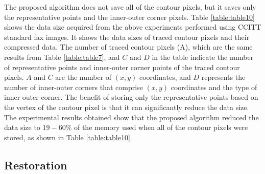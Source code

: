 
The proposed algorithm does not save all of the contour pixels, but it saves only the representative points and the inner-outer corner pixels. Table \ref{table:table10} shows the data size acquired from the above experiments performed using CCITT standard fax images. It shows the data sizes of traced contour pixels and their compressed data. The number of traced contour pixels (A), which are the same results from Table \ref{table:table7}, and $C$ and $D$ in the table indicate the number of representative points and inner-outer corner points of the traced contour pixels. $A$ and $C$ are the number of $(x, y)$ coordinates, and $D$ represents the number of inner-outer corners that comprise $(x, y)$ coordinates and the type of inner-outer corner. The benefit of storing only the representative points based on the vertex of the contour pixel is that it can significantly reduce the data size. The experimental results obtained show that the proposed algorithm reduced the data size to $19-60\%$ of the memory used when all of the contour pixels were stored, as shown in Table \ref{table:table10}.



\subsection{Restoration}

